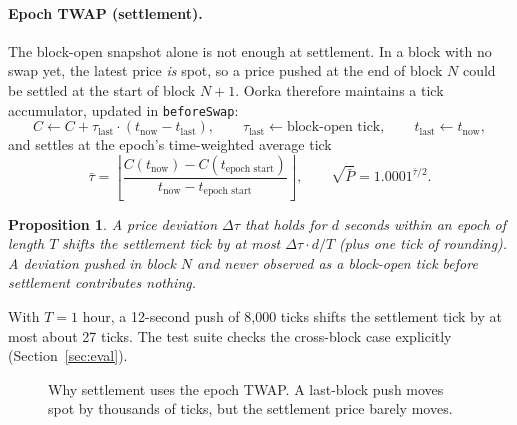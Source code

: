\documentclass[11pt,a4paper]{article}
\newtheorem{proposition}{Proposition}
\newcommand{\code}[1]{\texttt{\small #1}}
\begin{document}
\paragraph{Epoch TWAP (settlement).} The block-open snapshot alone is not enough at settlement. In a block with no swap yet, the latest price \emph{is} spot, so a price pushed at the end of block $N$ could be settled at the start of block $N{+}1$. Oorka therefore maintains a tick accumulator, updated in \code{beforeSwap}:
\begin{equation}
  C \leftarrow C + \tau_{\text{last}} \cdot (t_{\text{now}} - t_{\text{last}}), \qquad \tau_{\text{last}} \leftarrow \text{block-open tick}, \qquad t_{\text{last}} \leftarrow t_{\text{now}},
\end{equation}
and settles at the epoch's time-weighted average tick
\begin{equation}
  \bar\tau = \left\lfloor \frac{C(t_{\text{now}}) - C(t_{\text{epoch start}})}{t_{\text{now}} - t_{\text{epoch start}}} \right\rfloor, \qquad \sqrt{\bar P} = 1.0001^{\bar\tau/2}.
\end{equation}

\begin{proposition}
A price deviation $\Delta\tau$ that holds for $d$ seconds within an epoch of length $T$ shifts the settlement tick by at most $\Delta\tau\cdot d/T$ (plus one tick of rounding). A deviation pushed in block $N$ and never observed as a block-open tick before settlement contributes nothing.
\end{proposition}

\noindent With $T=1$ hour, a 12-second push of 8{,}000 ticks shifts the settlement tick by at most about 27 ticks. The test suite checks the cross-block case explicitly (Section~\ref{sec:eval}).

\begin{figure}[h]
\centering
{}
\caption{Why settlement uses the epoch TWAP. A last-block push moves spot by thousands of ticks, but the settlement price barely moves.}
\label{fig:twap}
\end{figure}
\end{document}
